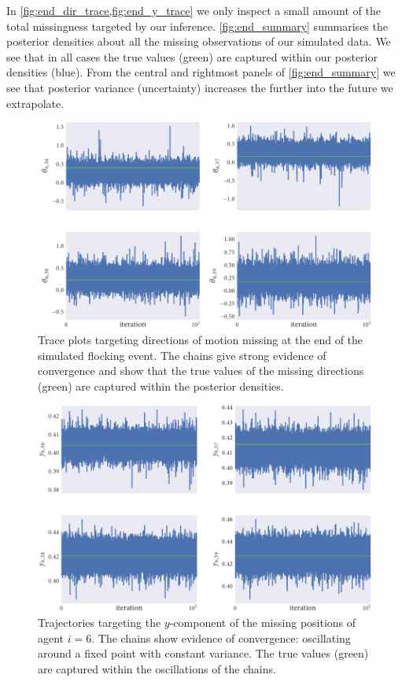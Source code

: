 In \cref{fig:end_dir_trace,fig:end_y_trace} we only inspect a small amount of
the total missingness targeted by our inference. \cref{fig:end_summary}
summarises the posterior densities about all the missing observations of our
simulated data. We see that in all cases the true values (green) are captured
within our posterior densities (blue). From the central and rightmost panels of
\cref{fig:end_summary} we see that posterior variance (uncertainty) increases
the further into the future we extrapolate.

\begin{figure}[tbp]
  \includegraphics{end/dir_trace.pdf}
  \caption{Trace plots targeting directions of motion missing at the end of the
    simulated flocking event. The chains give strong evidence of convergence and
    show that the true values of the missing directions (green) are captured within
    the posterior densities.}
  \label{fig:end_dir_trace}
\end{figure}
\begin{figure}[tbp]
  \includegraphics{end/y_trace.pdf}
  \caption{Trajectories targeting the $y$-component of the missing positions of
    agent $i=6$. The chains show evidence of convergence: oscillating around
    a fixed point with constant variance. The true values (green) are
    captured within the oscillations of the chains.}
  \label{fig:end_y_trace}
\end{figure}
